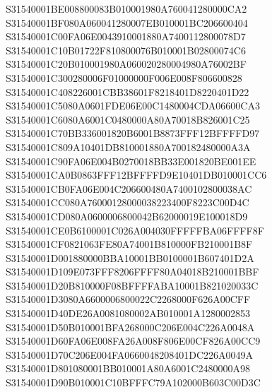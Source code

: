 \documentclass[12pt,a4paper]{article}
\begin{document}
\begin{framed}
{S31540001BE008800083B010001980A760041280000CA2\newline
S31540001BF080A060041280007EB010001BC206600404\newline
S31540001C00FA06E0043910001880A7400112800078D7\newline
S31540001C10B01722F810800076B010001B02800074C6\newline
S31540001C20B010001980A060020280004980A76002BF\newline
S31540001C300280006F01000000F006E008F806600828\newline
S31540001C408226001CBB38601F8218401D8220401D22\newline
S31540001C5080A0601FDE06E00C1480004CDA06600CA3\newline
S31540001C6080A6001C0480000A80A70018B826001C25\newline
S31540001C70BB336001820B6001B8873FFF12BFFFFD97\newline
S31540001C809A10401DB810001880A700182480000A3A\newline
S31540001C90FA06E004B0270018BB33E001820BE001EE\newline
S31540001CA0B0863FFF12BFFFFD9E10401DB010001CC6\newline
S31540001CB0FA06E004C206600480A7400102800038AC\newline
S31540001CC080A76000128000038223400F8223C00D4C\newline
S31540001CD080A0600006800042B62000019E100018D9\newline
S31540001CE0B6100001C026A004030FFFFFBA06FFFF8F\newline
S31540001CF0821063FE80A74001B810000FB210001B8F\newline
S31540001D001880000BBA10001BB0100001B607401D2A\newline
S31540001D109E073FFF8206FFFF80A04018B210001BBF\newline
S31540001D20B810000F08BFFFFABA10001B821020033C\newline
S31540001D3080A6600006800022C2268000F626A00CFF\newline
S31540001D40DE26A0081080002AB010001A1280002853\newline
S31540001D50B010001BFA268000C206E004C226A0048A\newline
S31540001D60FA06E008FA26A008F806E00CF826A00CC9\newline
S31540001D70C206E004FA0660048208401DC226A0049A\newline
S31540001D801080001BB010001A80A6001C2480000A98\newline
S31540001D90B010001C10BFFFC79A102000B603C00D3C\newline
}
\end{framed}
\end{document}
